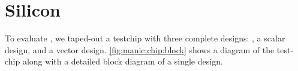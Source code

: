 \figMANICChipBlock

\section{\manic Silicon}
\label{manic:silicon}
To evaluate \manic, we taped-out a testchip with three complete designs: \manic, a scalar design, and a vector design.
% 
\autoref{fig:manic:chip:block} shows a diagram of the test-chip along with a detailed block diagram of a single design.
% 

\figMANICChip
\tabMANICEval